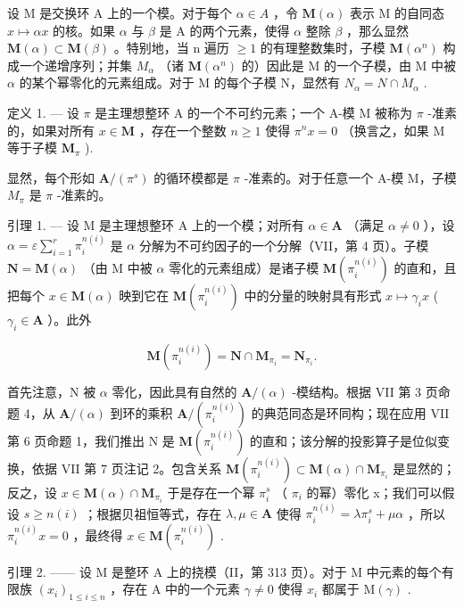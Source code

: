 设 M 是交换环 A 上的一个模。对于每个 \(\alpha\in A\) ，令 \(\mathbf{M}(\alpha)\) 表示 M 的自同态 \(x\mapsto\alpha x\) 的核。如果 \(\alpha\) 与 \(\beta\) 是 A 的两个元素，使得 \(\alpha\) 整除 \(\beta\) ，那么显然 \(\mathbf{M}(\alpha)\subset\mathbf{M}(\beta)\) 。特别地，当 n 遍历 \(\geqslant1\) 的有理整数集时，子模 \(\mathbf{M}(\alpha^{n})\) 构成一个递增序列；并集 \(M_{\alpha}\) （诸 \(\mathbf{M}(\alpha^{n})\) 的）因此是 M 的一个子模，由 M 中被 \(\alpha\) 的某个幂零化的元素组成。对于 M 的每个子模 N，显然有 \(N_{\alpha}=N\cap M_{\alpha}\) .

定义 1. --- 设 \(\pi\) 是主理想整环 A 的一个不可约元素；一个 A-模 M 被称为 \(\pi\) -准素的，如果对所有 \(x \in \mathbf{M}\) ，存在一个整数 \(n \geqslant 1\) 使得 \(\pi^n x = 0\) （换言之，如果 M 等于子模 \(\mathbf{M}_{\pi}\) ).

显然，每个形如 \(\mathbf{A}/(\pi^{s})\) 的循环模都是 \(\pi\) -准素的。对于任意一个 A-模 M，子模 \(M_{\pi}\) 是 \(\pi\) -准素的。

引理 1. --- 设 M 是主理想整环 A 上的一个模；对所有 \(\alpha \in \mathbf{A}\) （满足 \(\alpha \neq 0\) ），设 \(\alpha = \varepsilon \sum_{i=1}^{r} \pi_i^{n(i)}\) 是 \(\alpha\) 分解为不可约因子的一个分解（VII，第 4 页）。子模 \(\mathbf{N} = \mathbf{M}(\alpha)\) （由 M 中被 \(\alpha\) 零化的元素组成）是诸子模 \(\mathbf{M}(\pi_i^{n(i)})\) 的直和，且把每个 \(x \in \mathbf{M}(\alpha)\) 映到它在 \(\mathbf{M}(\pi_i^{n(i)})\) 中的分量的映射具有形式 \(x \mapsto \gamma_i x\) ( \(\gamma_i \in \mathbf{A}\) ）。此外

\[
\mathbf {M} \left(\pi_ {i} ^ {n (i)}\right) = \mathbf {N} \cap \mathbf {M} _ {\pi_ {i}} = \mathbf {N} _ {\pi_ {i}}.
\]

首先注意，N 被 \(\alpha\) 零化，因此具有自然的 \(\mathbf{A}/(\alpha)\) -模结构。根据 VII 第 3 页命题 4，从 \(\mathbf{A}/(\alpha)\) 到环的乘积 \(\mathbf{A}/(\pi_{i}^{n(i)})\) 的典范同态是环同构；现在应用 VII 第 6 页命题 1，我们推出 N 是 \(\mathbf{M}(\pi_{i}^{n(i)})\) 的直和；该分解的投影算子是位似变换，依据 VII 第 7 页注记 2。包含关系 \(\mathbf{M}(\pi_{i}^{n(i)})\subset\mathbf{M}(\alpha)\cap\mathbf{M}_{\pi_{i}}\) 是显然的；反之，设 \(x\in\mathbf{M}(\alpha)\cap\mathbf{M}_{\pi_{i}}\) 于是存在一个幂 \(\pi_{i}^{s}\) （ \(\pi_{i}\) 的幂）零化 x；我们可以假设 \(s\geqslant n(i)\) ；根据贝祖恒等式，存在 \(\lambda,\mu\in\mathbf{A}\) 使得 \(\pi_{i}^{n(i)}=\lambda\pi_{i}^{s}+\mu\alpha\) ，所以 \(\pi_{i}^{n(i)}x=0\) ，最终得 \(x\in\mathbf{M}(\pi_{i}^{n(i)})\) .

引理 2. —— 设 M 是整环 A 上的挠模（II，第 313 页）。对于 M 中元素的每个有限族 \((x_{i})_{1 \leq i \leq n}\) ，存在 A 中的一个元素 \(\gamma \neq 0\) 使得 \(x_{i}\) 都属于 \(\mathrm{M}(\gamma)\) .

